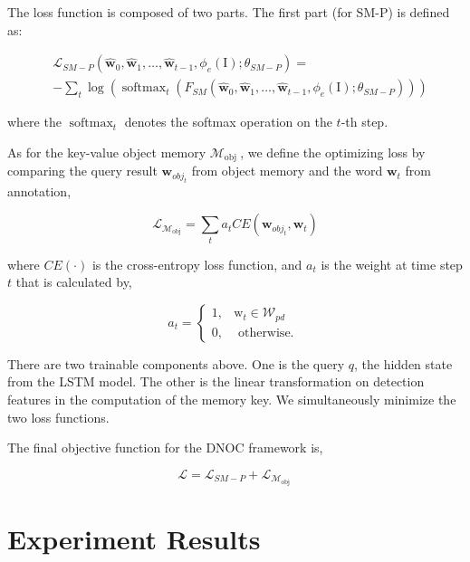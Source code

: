 \documentclass[a4paper, 11pt]{article} %
\begin{document}
The loss function is composed of two parts. The first part (for SM-P) is defined as:

$$
	\begin{aligned}
		 & \mathcal{L}_{S M-P}\left(\hat{\mathbf{w}}_{0}, \hat{\mathbf{w}}_{1}, \ldots, \hat{\mathbf{w}}_{t-1}, \phi_{e}(\mathrm{I}) ; \theta_{S M-P}\right)=                                                       \\
		 & -\sum_{t} \log \left(\operatorname{softmax}_{t}\left(F_{S M}\left(\hat{\mathbf{w}}_{0}, \hat{\mathbf{w}}_{1}, \ldots, \hat{\mathbf{w}}_{t-1}, \phi_{e}(\mathrm{I}) ; \theta_{S M-P}\right)\right)\right)
	\end{aligned}
$$


where the $\operatorname{softmax}_{t}$ denotes the softmax operation on the $t$-th step.

As for the key-value object memory $\mathcal{M}_{\text {obj }}$, we define the optimizing
loss by comparing the query result $\mathbf{w}_{o b j_{t}}$ from object memory and the
word $\mathbf{w}_{t}$ from annotation,

$$
	\mathcal{L}_{\mathcal{M}_{\mathrm{obj}}}=\sum_{t} a_{t} C E\left(\mathbf{w}_{o b j_{t}}, \mathbf{w}_{t}\right)
$$

where $C E(\cdot)$ is the cross-entropy loss function, and $a_{t}$ is the weight at time
step $t$ that is calculated by,

$$
	a_{t}= \begin{cases}1, & \mathrm{w}_{t} \in \mathcal{W}_{p d} \\ 0, & \text { otherwise. }\end{cases}
$$

There are two trainable components above. One is the query $q$, the hidden state from the
LSTM model. The other is the linear transformation on detection features in the computation
of the memory key. We simultaneously minimize the two loss functions.

The final objective function for the DNOC framework is,

$$
	\mathcal{L}=\mathcal{L}_{S M-P}+\mathcal{L}_{\mathcal{M}_{\text {obj }}}
$$

\bigskip


\section{\textbf{Experiment Results}}
\end{document}
